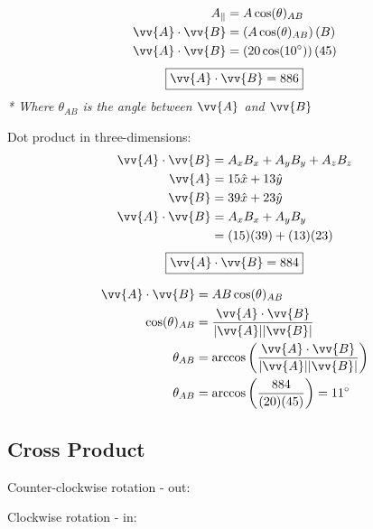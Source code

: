 \documentclass{article}
\begin{document}
\begin{align*}
    A_{\parallel} & = A \cos(\theta)_{AB} \\
    \vv{A} \cdot \vv{B} & = \left( A \cos(\theta)_{AB} \right) \left( B \right) \\
    \vv{A} \cdot \vv{B} & = \left( 20 \cos(10 \degree) \right) (45)
\end{align*}
\begin{equation*}
    \boxed{\vv{A} \cdot \vv{B} = 886}
\end{equation*}
\textit{* Where $ \theta_{AB} $ is the angle between $ \vv{A} $ and $ \vv{B} $}

Dot product in three-dimensions:
\begin{align*}
    \vv{A} \cdot \vv{B} & = A_{x}B_{x} + A_{y}B_{y} + A_{z}B_{z} \\
    \vv{A} & = 15 \hat{x} + 13 \hat{y} \\
    \vv{B} & = 39 \hat{x} + 23 \hat{y} \\
    \vv{A} \cdot \vv{B} & = A_{x}B_{x} + A_{y}B_{y} \\
                        & = (15)(39) + (13)(23)
\end{align*}
\begin{equation*}
    \boxed{\vv{A} \cdot \vv{B} = 884}
\end{equation*}

\begin{align*}
    \vv{A} \cdot \vv{B} & = AB \cos(\theta)_{AB} \\
    \cos(\theta)_{AB} & = \frac{\vv{A} \cdot \vv{B}}{|\vv{A}||\vv{B}|} \\
    \theta_{AB} & = \arccos \left( \frac{\vv{A} \cdot \vv{B}}{|\vv{A}||\vv{B}|} \right) \\
    \theta_{AB} & = \arccos \left( \frac{884}{(20)(45)} \right) = 11 \degree 
\end{align*}

\subsection{Cross Product}

Counter-clockwise rotation - out:


Clockwise rotation - in:
\end{document}
